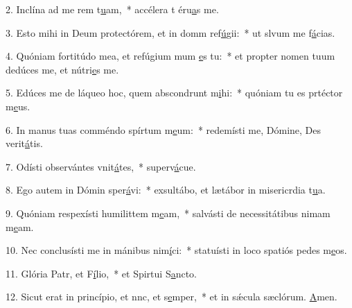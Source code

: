 2. Inclína ad me rem t\uline{u}am,~* accélera t éru\uline{a}s me.\par 
3. Esto mihi in Deum protectórem, et in domm ref\uline{ú}gii:~* ut slvum me f\uline{á}cias.\par 
4. Quóniam fortitúdo mea, et refúgium mum \uline{e}s tu:~* et propter nomen tuum dedúces me, et nútri\uline{e}s me.\par 
5. Edúces me de láqueo hoc, quem abscondrunt m\uline{i}hi:~* quóniam tu es prtéctor m\uline{e}us.\par 
6. In manus tuas comméndo spírtum m\uline{e}um:~* redemísti me, Dómine, Des verit\uline{á}tis.\par 
7. Odísti observántes vnit\uline{á}tes,~* superv\uline{á}cue.\par 
8. Ego autem in Dómin sper\uline{á}vi:~* exsultábo, et lætábor in misericrdia t\uline{u}a.\par 
9. Quóniam respexísti humilittem m\uline{e}am,~* salvásti de necessitátibus nimam m\uline{e}am.\par 
10. Nec conclusísti me in mánibus nim\uline{í}ci:~* statuísti in loco spatiós pedes m\uline{e}os.\par 
11. Glória Patr, et F\uline{í}lio,~* et Spirtui S\uline{a}ncto.\par 
12. Sicut erat in princípio, et nnc, et s\uline{e}mper,~* et in sǽcula sæclórum. \uline{A}men.\par 
